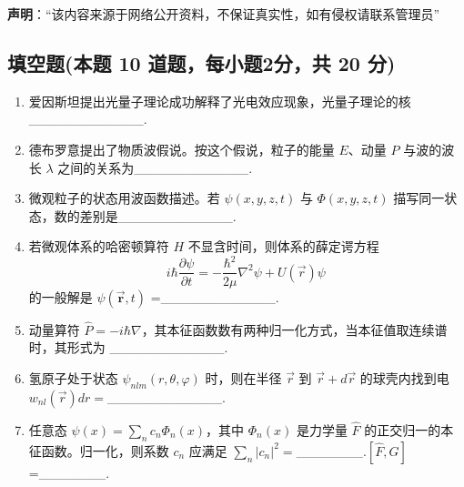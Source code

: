
\textbf{声明}：“该内容来源于网络公开资料，不保证真实性，如有侵权请联系管理员”

\subsection{填空题(本题 10 道题，每小题2分，共 20 分)}
\begin{enumerate}
\item 爱因斯坦提出光量子理论成功解释了光电效应现象，光量子理论的核____________.
\item 德布罗意提出了物质波假说。按这个假说，粒子的能量 $E$、动量 $P$ 与波的波长 $\lambda$ 之间的关系为____________.
\item 微观粒子的状态用波函数描述。若 $\psi(x,y,z,t)$ 与 $\Phi(x,y,z,t)$ 描写同一状态，数的差别是____________.
\item 若微观体系的哈密顿算符 $H$ 不显含时间，则体系的薛定谔方程 
   $$i \hbar \frac{\partial \psi}{\partial t} = -\frac{\hbar^2}{2 \mu} \nabla^2 \psi + U(\vec r) \psi~$$
    的一般解是 $\psi(\mathbf{\vec r},t)$ =____________.
\item 动量算符 $\hat{P} = -i\hbar\nabla$，其本征函数数有两种归一化方式，当本征值取连续谱时，其形式为 ____________.
\item 氢原子处于状态 $\psi_{nlm}(r, \theta, \varphi)$ 时，则在半径 $\vec r$ 到 $\vec r + d\vec r$ 的球壳内找到电 $w_{nl}(\vec r) dr =$____________.
\item 任意态 $\psi(x) = \sum_n c_n \Phi_n(x)$，其中 $\Phi_n(x)$ 是力学量 $\hat{F}$ 的正交归一的本征函数。归一化，则系数 $c_n$ 应满足 $\sum_n |c_n|^2 =$_______.$[\hat{F}, \hat{G}] $=_______.
\end{enumerate}
